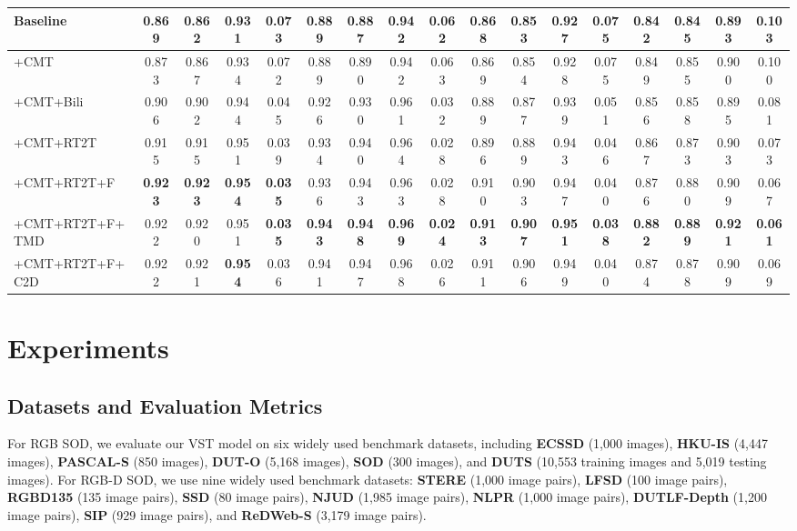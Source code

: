 \documentclass[10pt,twocolumn,letterpaper]{article}
\def\blu#1{\textbf{\color{blue} #1}} \def\red#1{\textbf{\color{red}\underline{#1}}}
\begin{document}
\begin{table*}[t]
\begin{tabular}{l|l|cccc|cccc|cccc|cccc}
\multicolumn{2}{l|}{Baseline}       &0.869 &0.862 &0.931 &0.073   &0.889 &0.887 &0.942 &0.062   &0.868 &0.853 &0.927 &0.075   &0.842 &0.845 &0.893 &0.103\\ \hline
\multicolumn{2}{l|}{+CMT}           &0.873 &0.867 &0.934 &0.072   &0.889 &0.890 &0.942 &0.063   &0.869 &0.854 &0.928 &0.075   &0.849 &0.855 &0.900 &0.100\\ \hline
\multicolumn{2}{l|}{+CMT+Bili}      &0.906 &0.902 &0.944 &0.045   &0.926 &0.930 &0.961 &0.032   &0.889 &0.877 &0.939 &0.051   &0.856 &0.858 &0.895 &0.081\\
\multicolumn{2}{l|}{+CMT+RT2T}       &0.915 &0.915 &0.951 &0.039   &0.934 &0.940 &0.964 &0.028   &0.896 &0.889 &0.943 &0.046   &0.867 &0.873 &0.903 &0.073\\ \hline
\multicolumn{2}{l|}{+CMT+RT2T+F}    &\blu{0.923} &\blu{0.923} &\blu{0.954} &\blu{0.035}   &0.936 &0.943 &0.963 &0.028   &0.910 &0.903 &0.947 &0.040   &0.876 &0.880 &0.909 &0.067\\
\multicolumn{2}{l|}{+CMT+RT2T+F+TMD}  &0.922 &0.920 &0.951 &\blu{0.035}   &\blu{0.943} &\blu{0.948} &\blu{0.969} &\blu{0.024}   &\blu{0.913} &\blu{0.907} &\blu{0.951} &\blu{0.038}   &\blu{0.882} &\blu{0.889} &\blu{0.921} &\blu{0.061}\\ \hline
\multicolumn{2}{l|}{+CMT+RT2T+F+C2D}  &0.922 &0.921 &\blu{0.954} &0.036   &0.941 &0.947 &0.968 &0.026   &0.911 &0.906 &0.949 &0.040   &0.874 &0.878 &0.909 &0.069\\ \hline
\end{tabular}
\label{ablationTab}
\vspace{-3mm}
\end{table*}


\section{Experiments}
\subsection{Datasets and Evaluation Metrics}


For RGB SOD, we evaluate our VST model on six widely used benchmark datasets, including \textbf{ECSSD} \cite{yan2013ECSSD} (1,000 images), \textbf{HKU-IS} \cite{li2015HKUIS} (4,447 images), \textbf{PASCAL-S} \cite{li2014PASCALS} (850 images), \textbf{DUT-O} \cite{yang2013DUTO} (5,168 images), \textbf{SOD} \cite{movahedi2010SOD} (300 images), and \textbf{DUTS} \cite{wang2017duts} (10,553 training images and 5,019 testing images).
For RGB-D SOD, we use nine widely used benchmark datasets: \textbf{STERE} \cite{niu2012stere} (1,000 image pairs), \textbf{LFSD} \cite{li2014lfsd} (100 image pairs), \textbf{RGBD135} \cite{cheng2014rgbd135} (135 image pairs), \textbf{SSD} \cite{zhu2017ssd} (80 image pairs), \textbf{NJUD} \cite{ju2014njud} (1,985 image pairs), \textbf{NLPR} \cite{peng2014nlpr} (1,000 image pairs), \textbf{DUTLF-Depth} \cite{Piao2019dmra} (1,200 image pairs), \textbf{SIP} \cite{fan2020SIP} (929 image pairs), and \textbf{ReDWeb-S} \cite{liu2020ReDWeb-S} (3,179 image pairs).
\end{document}
